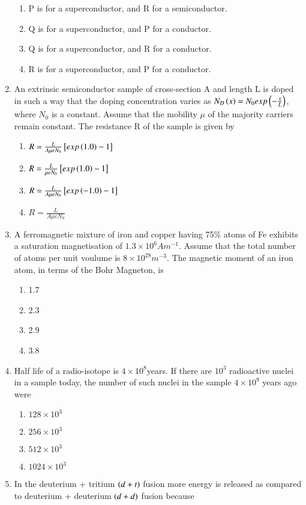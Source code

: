 \documentclass[journal]{IEEEtran}
\numberwithin{equation}{enumi}
\numberwithin{figure}{enumi}
\begin{document}
\begin{enumerate}
\begin{enumerate}
			\item P is for a superconductor, and R for a semiconductor.
			\item Q is for a superconductor, and P for a conductor.
			\item Q is for a superconductor, and R for a conductor.
			\item R is for a superconductor, and P for a conductor.
		\end{enumerate}
	\item An extrinsic semiconductor sample of cross-section A and length L is doped in such a way that the doping concentration varies as $N_D\left(x\right) = N_0exp\left(-\frac{x}{L}\right)$, where $N_0$ is a constant. Assume that the mobility $\mu$ of the majority carriers remain constant. The resistance R of the sample is given by
		\begin{enumerate}
			\item $R = \frac{L}{A\mu eN_0}{}\left[exp\left(1.0\right) - 1\right]$
			\item $R = \frac{L}{\mu eN_0}{}\left[exp\left(1.0\right) - 1\right]$
			\item $R = \frac{L}{A\mu eN_0}{}\left[exp\left(-1.0\right) - 1\right]$
			\item $R= \frac{L}{A\mu eN_0}$
		\end{enumerate}
	\item A ferromagnetic mixture of iron and copper having 75\% atoms of Fe exhibits a saturation magnetisation of $1.3\times10^6 A m^{-1}$. Assume that the total number of atoms per unit voulume is $8\times10^{28} m^{-3}$. The magnetic moment of an iron atom, in terms of the Bohr Magneton, is
		\begin{enumerate}
			\item 1.7
			\item 2.3
			\item 2.9
			\item 3.8
		\end{enumerate}
	\item Half life of a radio-isotope is $4\times10^8$years. If there are $10^3$ radioactive nuclei in a sample today, the number of such nuclei in the sample $4\times10^9$ years ago were
		\begin{enumerate}
			\item $128\times10^3$
			\item $256\times10^3$
			\item $512\times10^3$
			\item $1024\times10^3$
		\end{enumerate}
	\item In the deuterium + tritium $\left(d+t\right)$ fusion more energy is released as compared to deuterium + deuterium $\left(d+d\right)$ fusion because

\end{enumerate}
\end{document}
